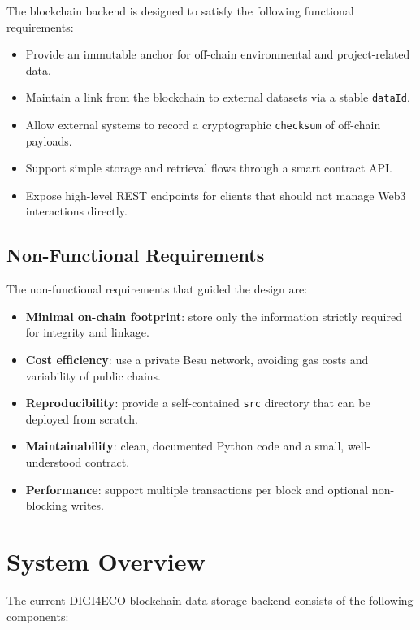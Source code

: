 \documentclass[11pt,a4paper]{article}
\begin{document}
The blockchain backend is designed to satisfy the following functional requirements:

\begin{itemize}[noitemsep]
  \item Provide an immutable anchor for off-chain environmental and project-related data.
  \item Maintain a link from the blockchain to external datasets via a stable \texttt{dataId}.
  \item Allow external systems to record a cryptographic \texttt{checksum} of off-chain payloads.
  \item Support simple storage and retrieval flows through a smart contract API.
  \item Expose high-level REST endpoints for clients that should not manage Web3 interactions directly.
\end{itemize}

\subsection{Non-Functional Requirements}

The non-functional requirements that guided the design are:

\begin{itemize}[noitemsep]
  \item \textbf{Minimal on-chain footprint}: store only the information strictly required for integrity and linkage.
  \item \textbf{Cost efficiency}: use a private Besu network, avoiding gas costs and variability of public chains.
  \item \textbf{Reproducibility}: provide a self-contained \texttt{src} directory that can be deployed from scratch.
  \item \textbf{Maintainability}: clean, documented Python code and a small, well-understood contract.
  \item \textbf{Performance}: support multiple transactions per block and optional non-blocking writes.
\end{itemize}

\section{System Overview}

The current DIGI4ECO blockchain data storage backend consists of the following components:
\end{document}
